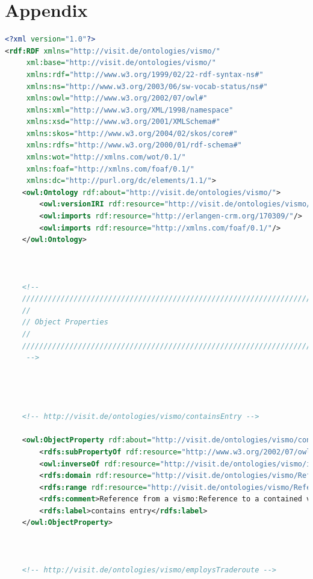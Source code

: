 \section{Appendix}\label{sec:appendix}

\begin{lstlisting}[caption={VisMo Ontologie in der letzten (englischen) Version.},label={lst:vismo},captionpos=b,language=xml]
<?xml version="1.0"?>
<rdf:RDF xmlns="http://visit.de/ontologies/vismo/"
     xml:base="http://visit.de/ontologies/vismo/"
     xmlns:rdf="http://www.w3.org/1999/02/22-rdf-syntax-ns#"
     xmlns:ns="http://www.w3.org/2003/06/sw-vocab-status/ns#"
     xmlns:owl="http://www.w3.org/2002/07/owl#"
     xmlns:xml="http://www.w3.org/XML/1998/namespace"
     xmlns:xsd="http://www.w3.org/2001/XMLSchema#"
     xmlns:skos="http://www.w3.org/2004/02/skos/core#"
     xmlns:rdfs="http://www.w3.org/2000/01/rdf-schema#"
     xmlns:wot="http://xmlns.com/wot/0.1/"
     xmlns:foaf="http://xmlns.com/foaf/0.1/"
     xmlns:dc="http://purl.org/dc/elements/1.1/">
    <owl:Ontology rdf:about="http://visit.de/ontologies/vismo/">
        <owl:versionIRI rdf:resource="http://visit.de/ontologies/vismo/0.4.5/"/>
        <owl:imports rdf:resource="http://erlangen-crm.org/170309/"/>
        <owl:imports rdf:resource="http://xmlns.com/foaf/0.1/"/>
    </owl:Ontology>
    


    <!-- 
    ///////////////////////////////////////////////////////////////////////////////////////
    //
    // Object Properties
    //
    ///////////////////////////////////////////////////////////////////////////////////////
     -->

    


    <!-- http://visit.de/ontologies/vismo/containsEntry -->

    <owl:ObjectProperty rdf:about="http://visit.de/ontologies/vismo/containsEntry">
        <rdfs:subPropertyOf rdf:resource="http://www.w3.org/2002/07/owl#topObjectProperty"/>
        <owl:inverseOf rdf:resource="http://visit.de/ontologies/vismo/isEntryIn"/>
        <rdfs:domain rdf:resource="http://visit.de/ontologies/vismo/Reference"/>
        <rdfs:range rdf:resource="http://visit.de/ontologies/vismo/ReferenceEntry"/>
        <rdfs:comment>Reference from a vismo:Reference to a contained vismo:ReferenceEntry.</rdfs:comment>
        <rdfs:label>contains entry</rdfs:label>
    </owl:ObjectProperty>
    


    <!-- http://visit.de/ontologies/vismo/employsTraderoute -->


\end{lstlisting}
